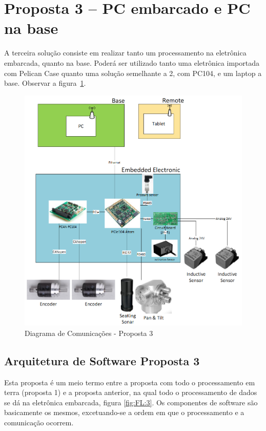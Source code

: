 


\section{Proposta 3 – PC embarcado e PC na base}


A terceira solução consiste em realizar tanto um processamento na eletrônica
embarcada, quanto na base. Poderá ser utilizado tanto uma eletrônica importada
com Pelican Case quanto uma solução semelhante a 2, com PC104, e um laptop a
base. Observar a figura~\ref{prop3}.

\begin{figure}[H]
    \centering
    \includegraphics[width=0.5\columnwidth]{figs/eletronica/5.png}
    \caption{Diagrama de Comunicações - Proposta 3}
    \label{prop3}
\end{figure} 

\subsection{Arquitetura de Software Proposta 3}
Esta proposta é um meio termo entre a proposta com todo o processamento em terra
(proposta 1) e a proposta anterior, na qual todo o processamento de dados se dá
na eletrônica embarcada, figura \ref{fig:FL:3}. Os componentes de software são
basicamente os mesmos, excetuando-se a ordem em que o processamento e a comunicação ocorrem.


